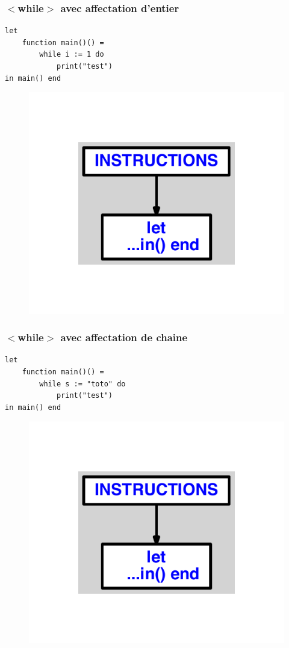 \documentclass{article}
\begin{document}
\subsubsection{$ < $while$ > $ avec affectation d'entier}
\begin{lstlisting}
let
	function main()() =
		while i := 1 do
			print("test")
in main() end
\end{lstlisting}
\newpage
\begin{figure}[H]
\centering
\includegraphics[max width=\textwidth]{ast/ast_323.pdf}
\end{figure}
\newpage
\subsubsection{$ < $while$ > $ avec affectation de chaine}
\begin{lstlisting}
let
	function main()() =
		while s := "toto" do
			print("test")
in main() end
\end{lstlisting}
\newpage
\begin{figure}[H]
\centering
\includegraphics[max width=\textwidth]{ast/ast_324.pdf}
\end{figure}
\newpage
\end{document}
